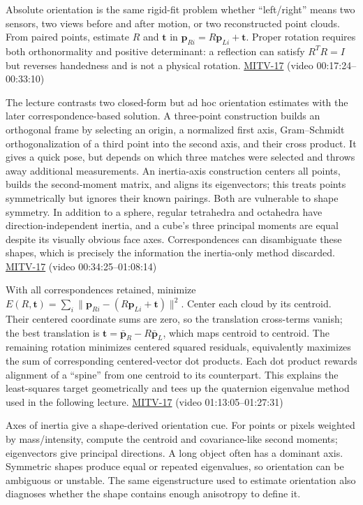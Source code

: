 Absolute orientation is the same rigid-fit problem whether ``left/right'' means two sensors, two views before and after motion, or two reconstructed point clouds. From paired points, estimate \(R\) and \(\mathbf{t}\) in \(\mathbf{p}_{Ri}=R\mathbf{p}_{Li}+\mathbf{t}\). Proper rotation requires both orthonormality and positive determinant: a reflection can satisfy \(R^TR=I\) but reverses handedness and is not a physical rotation. \hyperref[04-visual-computing-ii-ch036]{MITV-17} (video 00:17:24--00:33:10)

The lecture contrasts two closed-form but ad hoc orientation estimates with the later correspondence-based solution. A three-point construction builds an orthogonal frame by selecting an origin, a normalized first axis, Gram--Schmidt orthogonalization of a third point into the second axis, and their cross product. It gives a quick pose, but depends on which three matches were selected and throws away additional measurements. An inertia-axis construction centers all points, builds the second-moment matrix, and aligns its eigenvectors; this treats points symmetrically but ignores their known pairings. Both are vulnerable to shape symmetry. In addition to a sphere, regular tetrahedra and octahedra have direction-independent inertia, and a cube's three principal moments are equal despite its visually obvious face axes. Correspondences can disambiguate these shapes, which is precisely the information the inertia-only method discarded. \hyperref[04-visual-computing-ii-ch036]{MITV-17} (video 00:34:25--01:08:14)

With all correspondences retained, minimize \(E(R,\mathbf{t})=\sum_i\|\mathbf{p}_{Ri}-(R\mathbf{p}_{Li}+\mathbf{t})\|^2\). Center each cloud by its centroid. Their centered coordinate sums are zero, so the translation cross-terms vanish; the best translation is \(\mathbf{t}=\bar{\mathbf{p}}_R-R\bar{\mathbf{p}}_L\), which maps centroid to centroid. The remaining rotation minimizes centered squared residuals, equivalently maximizes the sum of corresponding centered-vector dot products. Each dot product rewards alignment of a ``spine'' from one centroid to its counterpart. This explains the least-squares target geometrically and tees up the quaternion eigenvalue method used in the following lecture. \hyperref[04-visual-computing-ii-ch036]{MITV-17} (video 01:13:05--01:27:31)

Axes of inertia give a shape-derived orientation cue. For points or pixels weighted by mass/intensity, compute the centroid and covariance-like second moments; eigenvectors give principal directions. A long object often has a dominant axis. Symmetric shapes produce equal or repeated eigenvalues, so orientation can be ambiguous or unstable. The same eigenstructure used to estimate orientation also diagnoses whether the shape contains enough anisotropy to define it.

